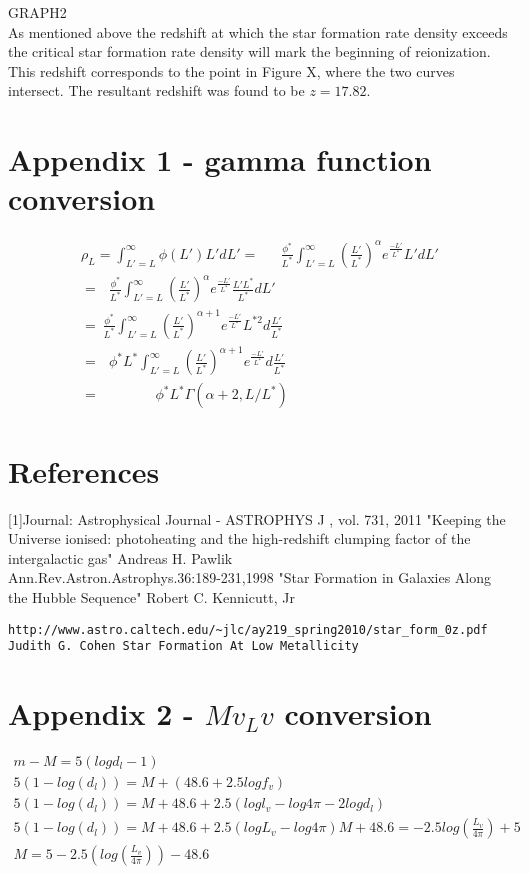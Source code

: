 \documentclass[pdf,color]{UoBnote}
\begin{document}
GRAPH2\\
\newline
As mentioned above the redshift at which the star formation rate density exceeds the critical star formation rate density will mark the beginning of reionization. This redshift corresponds to the point in Figure X, where the two curves intersect. The resultant redshift was found to be $z=17.82$.



\section{Appendix 1 - gamma function conversion}

\begin{eqnarray}
\rho_L = \int^{\infty}_{L'=L} \phi(L')L'dL'=\ \ \ \ \ \ \ \frac{\phi^*}{L^*}\int^{\infty}_{L'=L}\left (\frac{L'}{L^*} \right )^{\alpha}e^\frac{-L'}{L^*}L'dL'\\
= \ \ \ \frac{\phi^*}{L^*}\int^{\infty}_{L'=L}\left (\frac{L'}{L^*}\right )^{\alpha}e^\frac{-L'}{L^*}\frac{L'L^*}{L^*}dL'\\
= \ \frac {\phi^*}{L^*}\int^{\infty}_{L'=L}\left ( \frac{L'}{L^*} \right )^{\alpha+1}e^\frac{-L'}{L^*}L^{*2}d\frac{L'}{L^*} \\
= \ \ \ \phi^*L^*\int^{\infty}_{L'=L}\left ( \frac{L'}{L^*} \right )^{\alpha+1}e^\frac{-L'}{L^*}d\frac{L'}{L^*} \\
= \ \ \ \ \ \ \ \ \ \ \ \ \ \ \ \ \ \ \phi^*L^*\Gamma(\alpha+2, L/L^*)
\end{eqnarray}

\section{References}

[1]Journal: Astrophysical Journal - ASTROPHYS J , vol. 731, 2011 "Keeping the Universe ionised: photoheating and the high-redshift clumping factor of the intergalactic gas" Andreas H. Pawlik \\
\newline
[2]Ann.Rev.Astron.Astrophys.36:189-231,1998 "Star Formation in Galaxies Along the Hubble Sequence" Robert C. Kennicutt, Jr \\
\newline
[3]\begin{verbatim}http://www.astro.caltech.edu/~jlc/ay219_spring2010/star_form_0z.pdf
Judith G. Cohen Star Formation At Low Metallicity\end{verbatim}

\section{Appendix 2 - $Mv_Lv$ conversion}
\begin{eqnarray}
m-M=5(log d_l - 1)\\
5(1-log (d_l))= M + (48.6+2.5log f_v) \\
5(1-log (d_l))= M + 48.6 + 2.5(log l_v - log 4\pi - 2 log d_l) \\
5(1-log (d_l))= M+48.6 + 2.5(log L_v - log 4\pi)
M+48.6=-2.5 log (\frac{L_v}{4\pi})+5 \\
M=5-2.5(log (\frac{L_v}{4\pi})) - 48.6
\end{eqnarray}
\end{document}

